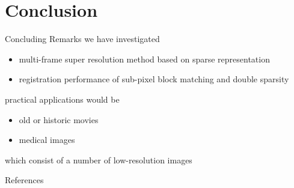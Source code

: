 \documentclass[fleqn,aspectratio=1610]{beamer}
\begin{document}
\section{Conclusion}
\label{sec:org7c3d54e}
\begin{frame}[label={sec:orgea66f6d}]{Concluding Remarks}
we have investigated
\begin{itemize}
\item multi-frame super resolution method based on sparse representation
\item registration performance of sub-pixel block matching and double sparsity
\end{itemize}


practical applications would be
\begin{itemize}
\item old or historic movies
\item medical images
\end{itemize}
which consist of a number of low-resolution images
\end{frame}

\begin{frame}[allowframebreaks]{References}
\printbibliography[heading=none]
\end{frame}
\end{document}
